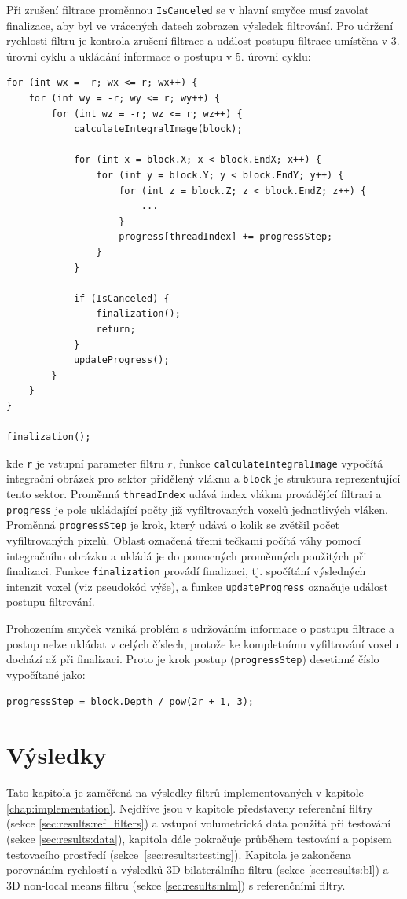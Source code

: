 Při zrušení filtrace proměnnou \texttt{IsCanceled} se v hlavní smyčce musí zavolat finalizace, aby byl ve vrácených datech zobrazen výsledek filtrování. Pro udržení rychlosti filtru je kontrola zrušení filtrace a událost postupu filtrace umístěna v 3. úrovni cyklu a ukládání informace o postupu v 5. úrovni cyklu:
\begin{verbatim}
for (int wx = -r; wx <= r; wx++) {
    for (int wy = -r; wy <= r; wy++) {
        for (int wz = -r; wz <= r; wz++) {
            calculateIntegralImage(block);
            
            for (int x = block.X; x < block.EndX; x++) {
                for (int y = block.Y; y < block.EndY; y++) {
                    for (int z = block.Z; z < block.EndZ; z++) {
                        ...
                    }
                    progress[threadIndex] += progressStep;
                }
            }
            
            if (IsCanceled) {
                finalization();
                return;
            }
            updateProgress();
        }
    }
}

finalization();
\end{verbatim}
kde \texttt{r} je vstupní parameter filtru $r$, funkce \texttt{calculateIntegralImage} vypočítá integrační obrázek pro sektor přidělený vláknu a \texttt{block} je struktura reprezentující tento sektor. Proměnná \texttt{threadIndex} udává index vlákna provádějící filtraci a \texttt{progress} je pole ukládající počty již vyfiltrovaných voxelů jednotlivých vláken. Proměnná \texttt{progressStep} je krok, který udává o kolik se zvětšil počet vyfiltrovaných pixelů. Oblast označená třemi tečkami počítá váhy pomocí integračního obrázku a ukládá je do pomocných proměnných použitých při finalizaci. Funkce \texttt{finalization} provádí finalizaci, tj. spočítání výsledných intenzit voxel (viz pseudokód výše), a funkce \texttt{updateProgress} označuje událost postupu filtrování.

Prohozením smyček vzniká problém s udržováním informace o postupu filtrace a postup nelze ukládat v celých číslech, protože ke kompletnímu vyfiltrování voxelu dochází až při finalizaci. Proto je krok postup (\texttt{progressStep}) desetinné číslo vypočítané jako:
\begin{verbatim}
progressStep = block.Depth / pow(2r + 1, 3);
\end{verbatim}

\chapter{Výsledky}
\label{chap:results}
Tato kapitola je zaměřená na výsledky filtrů implementovaných v kapitole \ref{chap:implementation}. Nejdříve jsou v kapitole představeny referenční filtry (sekce \ref{sec:results:ref_filters}) a vstupní volumetrická data použitá při testování (sekce \ref{sec:results:data}), kapitola dále pokračuje průběhem testování a popisem testovacího prostředí (sekce~\ref{sec:results:testing}). Kapitola je zakončena porovnáním rychlostí a výsledků 3D bilaterálního filtru (sekce \ref{sec:results:bl}) a 3D non-local means filtru (sekce \ref{sec:results:nlm}) s referenčními filtry.

